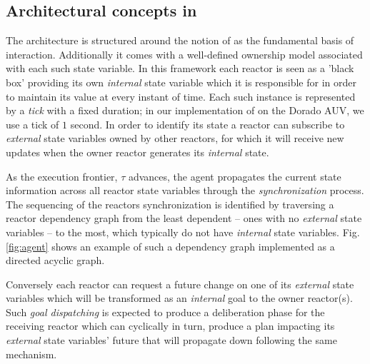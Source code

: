 \subsection{Architectural concepts in \rx}
\label{sec:arch:trex}

The \rx architecture is structured around the notion of  as the fundamental basis of interaction. Additionally it
comes with a well-defined ownership model associated with each such
state variable. In this framework each reactor is seen as a 'black
box' providing its own {\em internal} state variable which it is
responsible for in order to maintain its value at every instant of
time. Each such instance is represented by a {\em tick} with a fixed
duration; in our implementation of \rx on the Dorado AUV, we use a
tick of $1$ second. In order to identify its state a reactor can
subscribe to {\em external} state variables owned by other reactors,
for which it will receive new updates when the owner reactor generates
its {\em internal} state.


As the execution frontier, $\tau$ advances, the \rx agent propagates
the current state information across all reactor state variables
through the {\em synchronization} process.  The sequencing of the
reactors synchronization is identified by traversing a reactor
dependency graph from the least dependent -- ones with no {\em
  external} state variables -- to the most, \ie which typically do not have
{\em internal} state variables. Fig. \ref{fig:agent} shows an example
of such a dependency graph implemented as a directed acyclic graph.

Conversely each reactor can request a future change on one of its {\em
  external} state variables which will be transformed as an {\em
  internal} goal to the owner reactor(s).  Such \emph{goal
  dispatching} is expected to produce a deliberation phase for the
receiving reactor which can cyclically in turn, produce a plan
impacting its {\em external} state variables' future that will
propagate down following the same mechanism.

